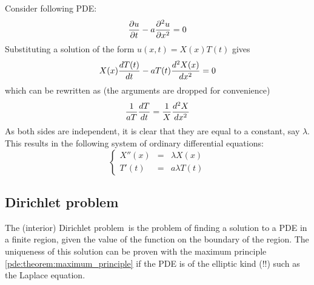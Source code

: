     \begin{example}
		Consider following PDE:
        \begin{equation}
			\frac{\partial u}{\partial t} - a\frac{\partial ^{2} u}{\partial x ^{2}} = 0
		\end{equation}
        Substituting a solution of the form $u(x, t) = X(x)T(t)$ gives
        \[
        	X(x)\frac{dT(t)}{dt} - aT(t)\frac{d^{2} X(x)}{d x ^{2}} = 0
        \]
        which can be rewritten as (the arguments are dropped for convenience)
        \[
        	\stylefrac{1}{aT}\deriv{T}{t} = \stylefrac{1}{X}\mderiv{2}{X}{x}
        \]
        As both sides are independent, it is clear that they are equal to a constant, say $\lambda$. This results in the following system of ordinary differential equations:
        \[
        	\left\{
            \begin{array}{ccc}
				X''(x) &=& \lambda X(x)\\
                T'(t) &=& a\lambda T(t)
			\end{array}
            \right.
        \]
	\end{example}

\subsection{Dirichlet problem}
	The (interior) Dirichlet problem\footnotemark\ is the problem of finding a solution to a PDE in a finite region, given the value of the function on the boundary of the region. The uniqueness of this solution can be proven with the maximum principle \ref{pde:theorem:maximum_principle} if the PDE is of the elliptic kind (!!) such as the Laplace equation\footnotemark.
	
    
